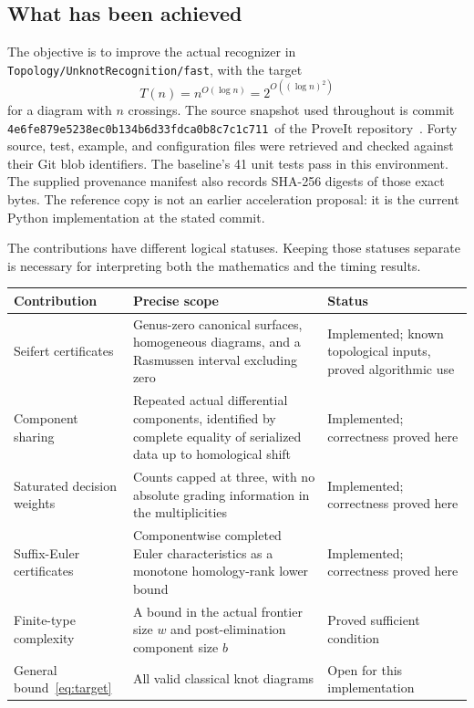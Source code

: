 \documentclass[11pt,letterpaper]{article}
\newcommand{\code}[1]{\texttt{#1}}
\newcommand{\pin}{\nolinkurl{4e6fe879e5238ec0b134b6d33fdca0b8c7c1c711}}
\begin{document}
\subsection{What has been achieved}
The objective is to improve the actual recognizer in
\code{Topology/UnknotRecognition/fast}, with the target
\begin{equation}\label{eq:target}
 T(n)=n^{O(\log n)}=2^{O((\log n)^2)}
\end{equation}
for a diagram with $n$ crossings. The source snapshot used throughout is
commit \pin\ of the ProveIt repository~\cite{proveit}. Forty source, test,
example, and configuration files were retrieved and checked against their
Git blob identifiers. The baseline's 41 unit tests pass in this environment.
The supplied provenance manifest also records SHA-256 digests of those exact
bytes. The reference copy is not an earlier acceleration proposal: it is the
current Python implementation at the stated commit.

The contributions have different logical statuses. Keeping those statuses
separate is necessary for interpreting both the mathematics and the timing
results.
\begin{center}\small
\begin{tabularx}{\textwidth}{@{}>{\raggedright\arraybackslash}p{}Y>{\raggedright\arraybackslash}p{.23\textwidth}@{}}
\toprule
Contribution & Precise scope & Status\\
\midrule
Seifert certificates & Genus-zero canonical surfaces, homogeneous diagrams,
and a Rasmussen interval excluding zero & Implemented; known topological
inputs, proved algorithmic use\\
Component sharing & Repeated actual differential components, identified by
complete equality of serialized data up to homological shift & Implemented;
correctness proved here\\
Saturated decision weights & Counts capped at three, with no absolute grading
information in the multiplicities & Implemented; correctness proved here\\
Suffix-Euler certificates & Componentwise completed Euler characteristics
as a monotone homology-rank lower bound & Implemented; correctness proved here\\
Finite-type complexity & A bound in the actual frontier size $w$ and
post-elimination component size $b$ & Proved sufficient condition\\
General bound~\eqref{eq:target} & All valid classical knot diagrams & Open for
this implementation\\
\bottomrule
\end{tabularx}
\end{center}
\end{document}
